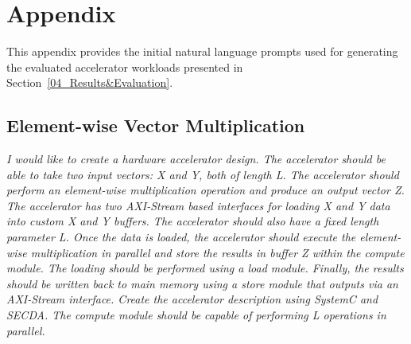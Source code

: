 
\section{Appendix}


This appendix provides the initial natural language prompts used for generating the evaluated accelerator workloads presented in Section~\ref{04_Results&Evaluation}.



\subsection{Element-wise Vector Multiplication}
\emph{
I would like to create a hardware accelerator design. The accelerator should be able to take two input vectors: X and Y, both of length L.
The accelerator should perform an element-wise multiplication
operation and produce an output vector Z.
The accelerator has two AXI-Stream based interfaces for loading
X and Y data into custom X and Y buffers.
The accelerator should also have a fixed length parameter L.
Once the data is loaded, the accelerator should execute the
element-wise multiplication in parallel and store the results
in buffer Z within the compute module.
The loading should be performed using a load module. Finally, the results should be written back to main memory using a store module that outputs via an AXI-Stream interface.
Create the accelerator description using SystemC and SECDA. The compute module should be capable of performing L operations in parallel.
}


